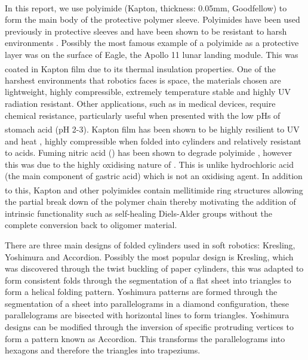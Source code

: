 In this report, we use polyimide (Kapton\textsuperscript{\textregistered}, thickness: 0.05mm, Goodfellow) to form the main body of the protective polymer sleeve. Polyimides have been used previously in protective sleeves and have been shown to be resistant to harsh environments \cite{butler2016highly}. Possibly the most famous example of a polyimide as a protective layer was on the surface of Eagle, the Apollo 11 lunar landing module. This was coated in Kapton\textsuperscript{\textregistered} film due to its thermal insulation properties. One of the harshest environments that robotics faces is space, the materials chosen are lightweight, highly compressible, extremely temperature stable and highly UV radiation resistant\cite{butler2016highly}. Other applications, such as in medical devices, require chemical resistance, particularly useful when presented with the low pHs of stomach acid (pH 2-3). Kapton\textsuperscript{\textregistered} film has been shown to be highly resilient to UV and heat \cite{butler2016highly,sroog1965aromatic}, highly compressible when folded into cylinders \cite{butler2016highly} and relatively resistant to acids. Fuming nitric acid () has been shown to degrade polyimide \cite{sroog1965aromatic}, however this was due to the highly oxidising nature of . This is unlike hydrochloric acid (the main component of gastric acid) which is not an oxidising agent. In addition to this, Kapton\textsuperscript{\textregistered} and other polyimides contain mellitimide ring structures allowing the partial break down of the polymer chain thereby motivating the addition of intrinsic functionality such as self-healing Diels-Alder groups without the complete conversion back to oligomer material.

There are three main designs of folded cylinders used in soft robotics: Kresling, Yoshimura and Accordion. Possibly the most popular design is Kresling, which was discovered through the twist buckling of paper cylinders\cite{masana2024kresling}, this was adapted to form consistent folds through the segmentation of a flat sheet into triangles to form a helical folding pattern\cite{zhang2025review}. Yoshimura patterns are formed through the segmentation of a sheet into parallelograms in a diamond configuration, these parallelograms are bisected with horizontal lines to form triangles\cite{wickeler20234d}. Yoshimura designs can be modified through the inversion of specific protruding vertices to form a pattern known as Accordion. This transforms the parallelograms into hexagons and therefore the triangles into trapeziums. 


